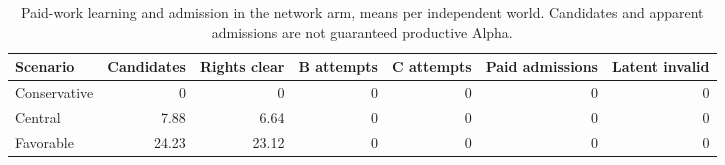 \begin{table}[!htbp]\centering\small
\caption{Paid-work learning and admission in the network arm, means per independent world. Candidates and apparent admissions are not guaranteed productive Alpha.}
\begin{tabularx}{\linewidth}{Yrrrrrr}\toprule
Scenario & Candidates & Rights clear & B attempts & C attempts & Paid admissions & Latent invalid\\\midrule
Conservative & 0 & 0 & 0 & 0 & 0 & 0\\
Central & 7.88 & 6.64 & 0 & 0 & 0 & 0\\
Favorable & 24.23 & 23.12 & 0 & 0 & 0 & 0\\
\bottomrule
\end{tabularx}
\end{table}
